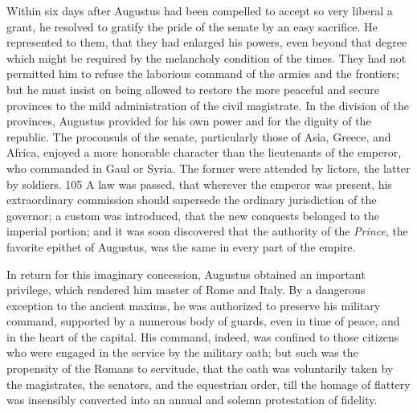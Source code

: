 Within six days after Augustus had been compelled to accept so
very liberal a grant, he resolved to gratify the pride of the
senate by an easy sacrifice. He represented to them, that they
had enlarged his powers, even beyond that degree which might be
required by the melancholy condition of the times. They had not
permitted him to refuse the laborious command of the armies and
the frontiers; but he must insist on being allowed to restore the
more peaceful and secure provinces to the mild administration of
the civil magistrate. In the division of the provinces, Augustus
provided for his own power and for the dignity of the republic.
The proconsuls of the senate, particularly those of Asia, Greece,
and Africa, enjoyed a more honorable character than the
lieutenants of the emperor, who commanded in Gaul or Syria. The
former were attended by lictors, the latter by soldiers. 105 A
law was passed, that wherever the emperor was present, his
extraordinary commission should supersede the ordinary
jurisdiction of the governor; a custom was introduced, that the
new conquests belonged to the imperial portion; and it was soon
discovered that the authority of the \textit{Prince}, the favorite
epithet of Augustus, was the same in every part of the empire.


In return for this imaginary concession, Augustus obtained an
important privilege, which rendered him master of Rome and Italy.
By a dangerous exception to the ancient maxims, he was authorized
to preserve his military command, supported by a numerous body of
guards, even in time of peace, and in the heart of the capital.
His command, indeed, was confined to those citizens who were
engaged in the service by the military oath; but such was the
propensity of the Romans to servitude, that the oath was
voluntarily taken by the magistrates, the senators, and the
equestrian order, till the homage of flattery was insensibly
converted into an annual and solemn protestation of fidelity.

